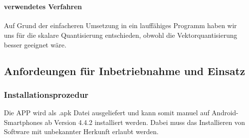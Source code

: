 \\
\\
\textbf{verwendetes Verfahren}
\\
\\
Auf Grund der einfacheren Umsetzung in ein lauffähiges Programm haben wir uns für die skalare Quantisierung entschieden, obwohl die Vektorquantisierung besser geeignet wäre.

\subsection{\textbf{Anfordeungen für Inbetriebnahme und Einsatz}}




\subsubsection{Installationsprozedur}

Die \acs{APP} wird als .apk Datei ausgeliefert und kann somit manuel auf Android-Smartphones ab Version 4.4.2 installiert werden.
Dabei muss das Installieren von Software mit unbekannter Herkunft erlaubt werden.


%








